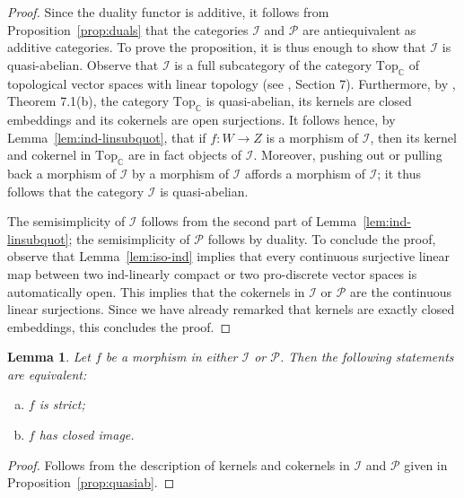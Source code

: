 \documentclass[12pt,reqno]{amsart}
\newcommand{\CC}{\mathbb{C}}
\newtheorem{lem}[thm]{Lemma}
\theoremstyle{definition}
\theoremstyle{remark}
\begin{document}
	\begin{proof}
	    Since the duality functor is additive, it follows from Proposition~\ref{prop:duals} that the categories $\mathcal{I}$ and $\mathcal{P}$ are antiequivalent as additive categories. To prove the proposition, it  is thus enough to show that $\mathcal{I}$ is quasi-abelian. Observe that $\mathcal{I}$ is a full subcategory of the category $\mathrm{Top}_\CC$ of topological vector spaces with linear topology (see \cite{Po}, Section 7). Furthermore, by \cite{Po}, Theorem 7.1(b), the category $\mathrm{Top}_\CC$ is quasi-abelian, its kernels are closed embeddings and its cokernels are open surjections. It follows hence, by Lemma~\ref{lem:ind-linsubquot}, that if $f:W\rightarrow Z$ is a morphism of $\mathcal{I}$, then its kernel and cokernel in $\mathrm{Top}_\CC$ are in fact objects of $\mathcal{I}$. Moreover,  pushing out or pulling back a morphism of $\mathcal{I}$ by a morphism of $\mathcal{I}$ affords a morphism of $\mathcal{I}$; it thus follows that the category $\mathcal{I}$ is quasi-abelian.
	    
	    The semisimplicity of $\mathcal{I}$ follows from the second part of Lemma~\ref{lem:ind-linsubquot}; the semisimplicity of $\mathcal{P}$ follows by duality. To conclude the proof, observe that Lemma~\ref{lem:iso-ind} implies that every continuous surjective linear map between two ind-linearly compact or two pro-discrete vector spaces is automatically open. This implies that the cokernels in $\mathcal{I}$ or $\mathcal{P}$ are the continuous linear surjections. Since we have already remarked that kernels are exactly closed embeddings, this concludes the proof.
	\end{proof}
	
	
	\begin{lem}\label{lem:strict}
	Let $f$ be a morphism in either $\mathcal{I}$ or $\mathcal{P}$. Then the following statements are equivalent:
	\begin{enumerate}[(a)]
	    \item $f$ is strict;
	    \item $f$ has closed image.
	\end{enumerate}
	\end{lem}
	\begin{proof}
	Follows from the description of kernels and cokernels in $\mathcal{I}$ and $\mathcal{P}$ given in Proposition~\ref{prop:quasiab}.
	\end{proof}
	

	
	
\end{document}
